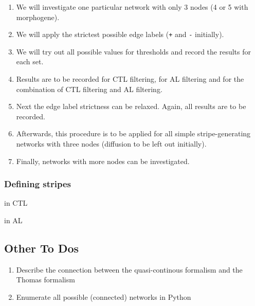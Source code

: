 \documentclass{article}
\begin{document}
\begin{enumerate}
  \item We will investigate one particular network with only 3 nodes (4 or 5
  with morphogene).
  \item We will apply the strictest possible edge labels ({\tt +} and {\tt -}
  initially).
  \item We will try out all possible values for thresholds and record the
  results for each set.
  \item Results are to be recorded for CTL filtering, for AL filtering and for
  the combination of CTL filtering and AL filtering.
  \item Next the edge label strictness can be relaxed. Again, all results are to
  be recorded.
  \item Afterwards, this procedure is to be applied for all simple
  stripe-generating networks with three nodes (diffusion to be left out initially).
  \item Finally, networks with more nodes can be investigated.
\end{enumerate}

\subsubsection{Defining stripes}

in CTL

in AL

\subsection{Other To Dos}

\begin{enumerate}
  \item Describe the connection between the quasi-continous formalism and the
  Thomas formalism
  \item Enumerate all possible (connected) networks in Python
\end{enumerate}
\end{document}
